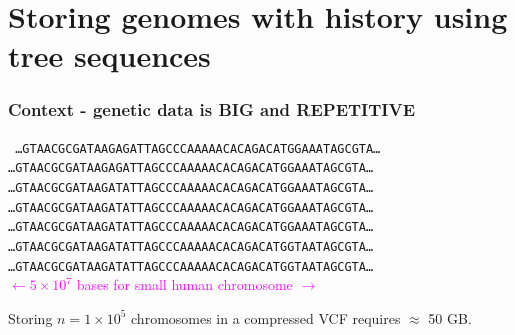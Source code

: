 \documentclass[11pt, mathserif, aspectratio=169]{beamer}
\newcommand{\magenta}[1]{\textcolor{magenta}{#1}}
\begin{document}
\section{Storing genomes with history using tree sequences}

\begin{frame}
\frametitle{Context - genetic data is BIG and REPETITIVE}
 \begin{center}
{\tt
\ldots GTAACGCGATAAGAGATTAGCCCAAAAACACAGACATGGAAATAGCGTA\ldots \\
\ldots GTAACGCGATAAGAGATTAGCCCAAAAACACAGACATGGAAATAGCGTA\ldots \\
\ldots GTAACGCGATAAGATATTAGCCCAAAAACACAGACATGGAAATAGCGTA\ldots \\
\ldots GTAACGCGATAAGATATTAGCCCAAAAACACAGACATGGAAATAGCGTA\ldots \\
\ldots GTAACGCGATAAGATATTAGCCCAAAAACACAGACATGGAAATAGCGTA\ldots \\
\ldots GTAACGCGATAAGATATTAGCCCAAAAACACAGACATGGTAATAGCGTA\ldots \\
\ldots GTAACGCGATAAGATATTAGCCCAAAAACACAGACATGGTAATAGCGTA\ldots \\[3mm]
}
\magenta{$\leftarrow 5\times 10^7$ bases for small human chromosome $\rightarrow$}
\end{center}
Storing $n = 1\times 10^5$ chromosomes in a compressed VCF requires $\approx$ 50 GB.
\end{frame}
\end{document}
